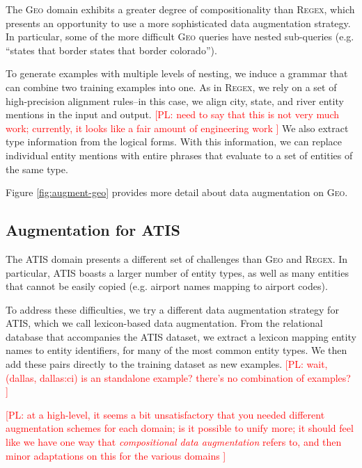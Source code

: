 \documentclass[11pt,letterpaper]{article}
\newcommand{\atis}{\textsc{ATIS}\xspace}
\newcommand{\regex}{\textsc{Regex}\xspace}
\newcommand{\geo}{\textsc{Geo}\xspace}
\newcommand\pl[1]{\textcolor{red}{[PL: #1]}}
\begin{document}
The \geo domain exhibits a greater degree of compositionality
than \regex, which presents an opportunity to use a more sophisticated
data augmentation strategy.
In particular, some of the more difficult \geo queries have
nested sub-queries (e.g. ``states that border states that border colorado'').

To generate examples with multiple levels of nesting,
we induce a grammar that can combine two training examples into one.
As in \regex, we rely on a set of high-precision alignment rules--in this case,
we align city, state, and river entity mentions in the input and output.
\pl{need to say that this is not very much work;
  currently, it looks like a fair amount of engineering work
}
We also extract type information from the logical forms.
With this information, we can replace individual entity mentions
with entire phrases that evaluate to a set of entities of the same type.

Figure \ref{fig:augment-geo}
provides more detail about data augmentation on \geo.

\subsection{Augmentation for \atis}
The \atis domain presents a different set of challenges than
\geo and \regex.  In particular, \atis boasts a larger number of
entity types, as well as many entities that cannot be easily copied
(e.g. airport names mapping to airport codes).

To address these difficulties, we try a different data augmentation
strategy for \atis, which we call lexicon-based data augmentation.
From the relational database that accompanies the \atis dataset,
we extract a lexicon mapping entity names to entity identifiers,
for many of the most common entity types.
We then add these pairs directly to the training dataset as new
examples.
\pl{wait, (dallas, dallas:ci) is an standalone example?
there's no combination of examples?
}

\pl{at a high-level, it seems a bit unsatisfactory that you needed
  different augmentation schemes for each domain;
  is it possible to unify more;
  it should feel like we have one way that \emph{compositional data augmentation}
  refers to, and then minor adaptations on this for the various domains
}
\end{document}
